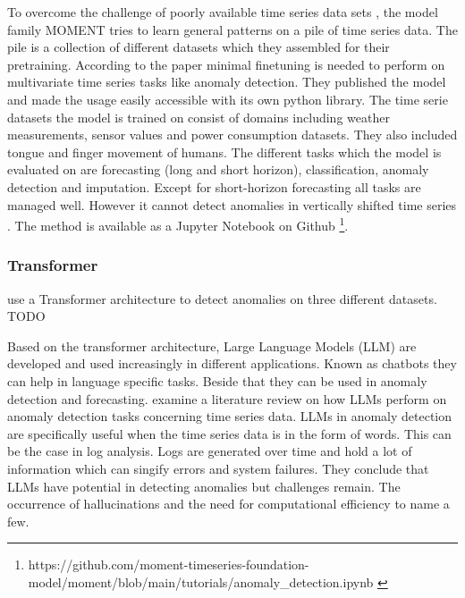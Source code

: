 To overcome the challenge of poorly available time series data sets \cite{ma_survey_2023}, the model family MOMENT tries to learn general patterns on a pile of time series data. The pile is a collection of different datasets which they assembled for their pretraining. According to the paper minimal finetuning is needed to perform on multivariate time series tasks like anomaly detection. They published the model and made the usage easily accessible with its own python library. The time serie datasets the model is trained on consist of domains including weather measurements, sensor values and power consumption datasets. They also included tongue and finger movement of humans. The different tasks which the model is evaluated on are forecasting (long and short horizon), classification, anomaly detection and imputation. Except for short-horizon forecasting all tasks are managed well. However it cannot detect anomalies in vertically shifted time series \cite{goswami_moment_2024}. The method is available as a Jupyter Notebook on Github \footnote{\fussy\tiny https://github.com/moment-timeseries-foundation-model/moment/blob/main/tutorials/anomaly\_detection.ipynb \label{foot_moment}}.


\subsubsection{Transformer}
\cite{xu_anomaly_2022} use a Transformer architecture to detect anomalies on three different datasets. TODO



\cite{wu_decompose_2023}

\cite{doshi_tisat_2022}

\cite{peng_tcf-trans_2023}

\cite{li_dct-gan_2023}

\cite{shin_time_2023}


Based on the transformer architecture, Large Language Models (LLM) are developed and used increasingly in different applications. Known as chatbots they can help in language specific tasks. Beside that they can be used in anomaly detection and forecasting. \cite{su_large_2024} examine a literature review on how LLMs perform on anomaly detection tasks concerning time series data. LLMs in anomaly detection are specifically useful when the time series data is in the form of words. This can be the case in log analysis. Logs are generated over time and hold a lot of information which can singify errors and system failures. They conclude that LLMs have potential in detecting anomalies but challenges remain. The occurrence of hallucinations and the need for computational efficiency to name a few.

